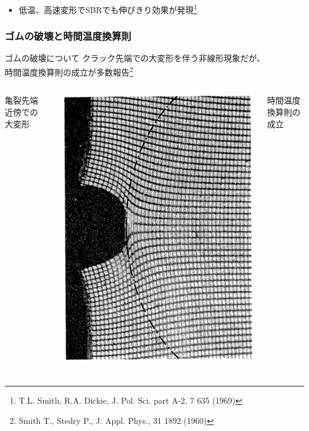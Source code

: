 \documentclass[12pt, dvipdfmx]{beamer}
\begin{document}
\begin{frame}
			\begin{itemize}
				\item \alert{低温、高速変形}でSBRでも伸びきり効果が発現\footnote{
					{\footnotesize T.L. Smith, R.A. Dickie, J. Pol. Sci. part A-2, 7 635 (1969)}
				}
			\end{itemize}

\end{frame}

\begin{frame}
	\frametitle{ゴムの破壊と時間温度換算則}
		\begin{alertblock}{ゴムの破壊について}
			クラック先端での大変形を伴う非線形現象だが、\\時間温度換算則の成立が多数報告\footnote{
				Smith T., Stedry P., J. Appl. Phys., 31 1892 (1960)
			}
		\end{alertblock}
		\vspace{-2mm}
		\begin{columns}[T, totalwidth=\textwidth]
				亀裂先端近傍での大変形
				\vspace{-3mm}
				\begin{center}
					\includegraphics[width=.55\textwidth]{rubber_crack.png}
				\end{center}
				時間温度換算則の成立

\end{columns}
\end{frame}
\end{document}
